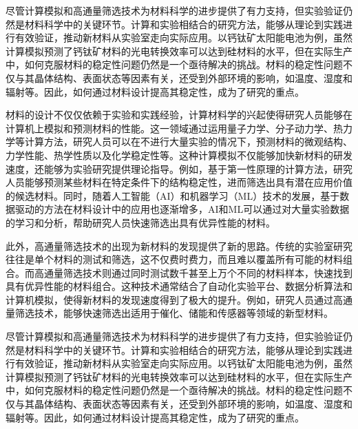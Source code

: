 尽管计算模拟和高通量筛选技术为材料科学的进步提供了有力支持，但实验验证仍然是材料科学中的关键环节。计算和实验相结合的研究方法，能够从理论到实践进行有效验证，推动新材料从实验室走向实际应用。以钙钛矿太阳能电池为例，虽然计算模拟预测了钙钛矿材料的光电转换效率可以达到硅材料的水平，但在实际生产中，如何克服材料的稳定性问题仍然是一个亟待解决的挑战。材料的稳定性问题不仅与其晶体结构、表面状态等因素有关，还受到外部环境的影响，如温度、湿度和辐射等。因此，如何通过材料设计提高其稳定性，成为了研究的重点。\par
材料的设计不仅仅依赖于实验和实践经验，计算材料学的兴起使得研究人员能够在计算机上模拟和预测材料的性能。这一领域通过运用量子力学、分子动力学、热力学等计算方法，研究人员可以在不进行大量实验的情况下，预测材料的微观结构、力学性能、热学性质以及化学稳定性等。这种计算模拟不仅能够加快新材料的研发速度，还能够为实验研究提供理论指导。例如，基于第一性原理的计算方法，研究人员能够预测某些材料在特定条件下的结构稳定性，进而筛选出具有潜在应用价值的候选材料。同时，随着人工智能（AI）和机器学习（ML）技术的发展，基于数据驱动的方法在材料设计中的应用也逐渐增多，AI和ML可以通过对大量实验数据的学习和分析，帮助研究人员快速筛选出具有优异性能的材料。\par
此外，高通量筛选技术的出现为新材料的发现提供了新的思路。传统的实验室研究往往是单个材料的测试和筛选，这不仅费时费力，而且难以覆盖所有可能的材料组合。而高通量筛选技术则通过同时测试数千甚至上万个不同的材料样本，快速找到具有优异性能的材料组合。这种技术通常结合了自动化实验平台、数据分析算法和计算机模拟，使得新材料的发现速度得到了极大的提升。例如，研究人员通过高通量筛选技术，能够快速筛选出适用于催化、储能和传感器等领域的新型材料。\par
尽管计算模拟和高通量筛选技术为材料科学的进步提供了有力支持，但实验验证仍然是材料科学中的关键环节。计算和实验相结合的研究方法，能够从理论到实践进行有效验证，推动新材料从实验室走向实际应用。以钙钛矿太阳能电池为例，虽然计算模拟预测了钙钛矿材料的光电转换效率可以达到硅材料的水平，但在实际生产中，如何克服材料的稳定性问题仍然是一个亟待解决的挑战。材料的稳定性问题不仅与其晶体结构、表面状态等因素有关，还受到外部环境的影响，如温度、湿度和辐射等。因此，如何通过材料设计提高其稳定性，成为了研究的重点。\par
